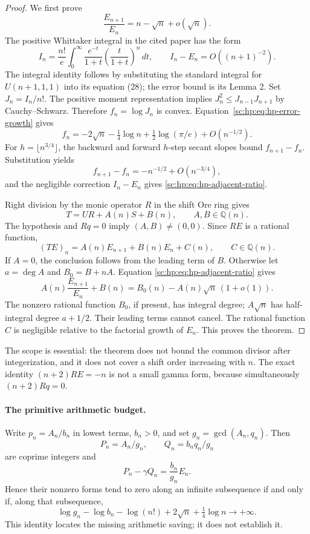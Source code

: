 \documentclass[11pt,a4paper]{article}
\theoremstyle{definition}
\theoremstyle{remark}
\theoremstyle{plain}
\numberwithin{equation}{section}
\begin{document}
\begin{proof}
We first prove
\begin{equation}\label{sc:hp:eq:hp-adjacent-ratio}
 \frac{E_{n+1}}{E_n}=n-\sqrt n+o(\sqrt n).
\end{equation}
The positive Whittaker integral in the cited paper has the form
\[
 I_n=\frac{n!}{e}\int_0^\infty
       \frac{e^{-t}}{1+t}\left(\frac t{1+t}\right)^n\,dt,
 \qquad I_n-E_n=O((n+1)^{-2}).
\]
The integral identity follows by substituting the standard integral for
$U(n+1,1,1)$ into its equation (28); the error bound is its Lemma 2.
Set $J_n=I_n/n!$.  The positive moment representation implies
$J_n^2\le J_{n-1}J_{n+1}$ by Cauchy--Schwarz.  Therefore
$f_n=\log J_n$ is convex.  Equation~\eqref{sc:hp:eq:hp-error-growth} gives
\[
 f_n=-2\sqrt n-\tfrac14\log n+\tfrac12\log(\pi/e)+O(n^{-1/2}).
\]
For $h=\lfloor n^{3/4}\rfloor$, the backward and forward $h$-step
secant slopes bound $f_{n+1}-f_n$.  Substitution yields
\[
 f_{n+1}-f_n=-n^{-1/2}+O(n^{-3/4}),
\]
and the negligible correction $I_n-E_n$ gives
\eqref{sc:hp:eq:hp-adjacent-ratio}.

Right division by the monic operator $R$ in the shift Ore ring gives
\[
 T=UR+A(n)S+B(n),\qquad A,B\in\mathbb Q(n).
\]
The hypothesis and $Rq=0$ imply $(A,B)\ne(0,0)$.  Since $RE$ is a
rational function,
\[
 (TE)_n=A(n)E_{n+1}+B(n)E_n+C(n),\qquad C\in\mathbb Q(n).
\]
If $A=0$, the conclusion follows from the leading term of $B$.
Otherwise let $a=\deg A$ and $B_0=B+nA$.  Equation
\eqref{sc:hp:eq:hp-adjacent-ratio} gives
\[
 A(n)\frac{E_{n+1}}{E_n}+B(n)
 =B_0(n)-A(n)\sqrt n\,(1+o(1)).
\]
The nonzero rational function $B_0$, if present, has integral degree;
$A\sqrt n$ has half-integral degree $a+1/2$.  Their leading terms
cannot cancel.  The rational function $C$ is negligible relative to
the factorial growth of $E_n$.  This proves the theorem.
\end{proof}

The scope is essential: the theorem does not bound the common divisor
after integerization, and it does not cover a shift order increasing
with $n$.  The exact identity $(n+2)RE=-n$ is not a small gamma form,
because simultaneously $(n+2)Rq=0$.

\paragraph{The primitive arithmetic budget.}
Write $p_n=A_n/b_n$ in lowest terms, $b_n>0$, and set
$g_n=\gcd(A_n,q_n)$.  Then
\[
 P_n=A_n/g_n,\qquad Q_n=b_nq_n/g_n
\]
are coprime integers and
\[
 P_n-\gamma Q_n=\frac{b_n}{g_n}E_n.
\]
Hence their nonzero forms tend to zero along an infinite subsequence
if and only if, along that subsequence,
\begin{equation}\label{sc:hp:eq:hp-primitive-budget}
 \log g_n-\log b_n-\log(n!)+2\sqrt n+\tfrac14\log n
 \longrightarrow+\infty.
\end{equation}
This identity locates the missing arithmetic saving; it does not
establish it.
\end{document}
